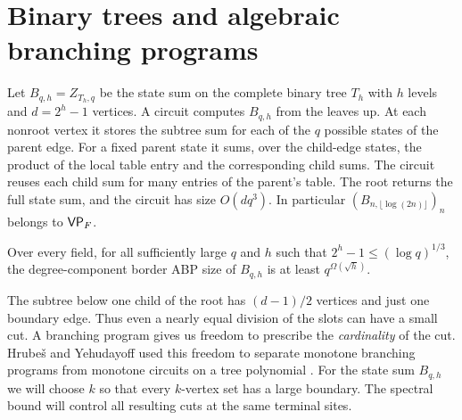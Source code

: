 \section{Binary trees and algebraic branching programs}\label{sec:bt}

Let $B_{q,h}=Z_{T_h,q}$ be the state sum on the complete binary tree
$T_h$ with $h$ levels and $d=2^h-1$ vertices. A circuit computes
$B_{q,h}$ from the leaves up. At each nonroot vertex it stores the
subtree sum for each of the $q$ possible states of the parent edge.
For a fixed parent state it sums, over the child-edge states, the
product of the local table entry and the corresponding child sums.
The circuit reuses each child sum for many entries of the parent's
table. The root returns the full state sum, and the circuit has
size $O(dq^3)$. In particular $(B_{n,\lfloor\log(2n)\rfloor})_n$ belongs to $\mathsf{VP}_F$.

\begin{theorem}\label{thm:b}
Over every field, for all sufficiently large $q$ and $h$ such that
$2^h-1\le(\log q)^{1/3}$, the degree-component border ABP size of
$B_{q,h}$ is at least $q^{\Omega(\sqrt h)}$.
\end{theorem}

The subtree below one child of the root has $(d-1)/2$ vertices
and just one boundary edge. Thus even a nearly equal division of
the slots can have a small cut. A branching program gives us freedom
to prescribe the \emph{cardinality} of the cut. Hrube\v{s} and Yehudayoff
used this freedom to separate monotone branching programs from monotone
circuits on a tree polynomial \cite[Proposition~13]{HrubesYehudayoff}.
For the state sum $B_{q,h}$ we will choose $k$ so that every $k$-vertex
set has a large boundary. The spectral bound will control all resulting
cuts at the same terminal sites.

